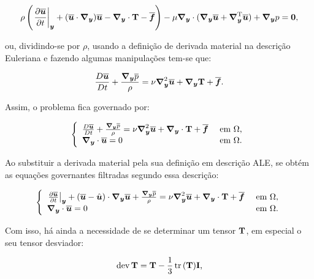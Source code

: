 \begin{equation}
    \rho\bigpar{\dTime{\BBB{u}}+(\BBB{u}\cdot\Ny)\BBB{u}-\Ny\cdot\TS{T}-\BBB{f}}-\mu\Ny\cdot(\Ny\BBB{u}+\NyT\BBB{u})+\Ny p=\BB{0}\text{,}\label{eq:ConMasLES}
\end{equation}

\noindent ou, dividindo-se por $\rho$, usando a definição de derivada material na descrição Euleriana e fazendo algumas manipulações tem-se que:

\begin{equation}
    \frac{D\BBB{u}}{Dt}+\frac{\Ny\bar{p}}{\rho}=\nu\Lapl\BBB{u}+\Ny\TS{T}+\BBB{f}\text{.}
\end{equation}


Assim, o problema fica governado por:

\begin{equation}
    \left\{
    \begin{array}{ll}
        \frac{D\BBB{u}}{Dt}+\frac{\Ny\bar{p}}{\rho}=\nu\Lapl\BBB{u}+\Ny\cdot\TS{T}+\BBB{f} & \text{ em }\Omega\text{,} \\
        \Ny\cdot\BBB{u}=0                                                                  & \text{ em }\Omega\text{.}
    \end{array}
    \right.
\end{equation}

Ao substituir a derivada material pela sua definição em descrição ALE, se obtém as equações governantes filtradas segundo essa descrição:

\begin{equation}
    \left\{
    \begin{array}{ll}
        \dTime{\BBB{u}}+(\BBB{u}-\uhat)\cdot\Ny\BBB{u}+\frac{\Ny\bar{p}}{\rho}=\nu\Lapl\BBB{u}+\Ny\cdot\TS{T}+\BBB{f} & \text{ em }\Omega\text{,} \\
        \Ny\cdot\BBB{u}=0                                                                                             & \text{ em }\Omega\text{.}
    \end{array}
    \right.
\end{equation}

Com isso, há ainda a necessidade de se determinar um tensor $\TS{T}$, em especial o seu tensor desviador:

\begin{equation}
    \dev{\TS{T}}=\TS{T}-\frac{1}{3}\tr{(\TS{T})}\TS{I}\text{,}
\end{equation}

